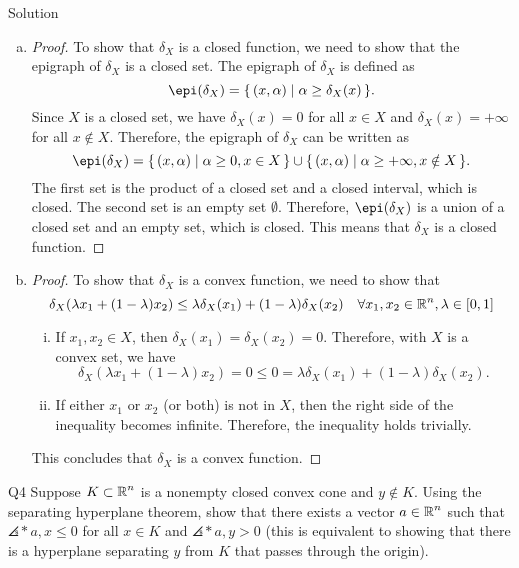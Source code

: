 \documentclass{article}
\begin{document}
\begin{solution}
    {Solution}
    \begin{enumerate}[(a)]
        \item {
            \begin{proof}
                To show that $\delta_X$ is a closed function, we need to show that the epigraph of $\delta_X$ is a closed set. The epigraph of $\delta_X$ is defined as
                \[
                    \epi(\delta_X) = \set{(x, \alpha) \mid \alpha \geq \delta_X(x)}.
                \]
                Since $X$ is a closed set, we have $\delta_X(x)=0$ for all $x\in X$ and $\delta_X(x)=+\infty$ for all $x\notin X$. Therefore, the epigraph of $\delta_X$ can be written as
                \[
                    \epi(\delta_X) = \set{(x, \alpha) \mid \alpha \geq 0, x\in X} \cup \set{(x, \alpha) \mid \alpha \geq +\infty, x\notin X}.
                \]
                The first set is the product of a closed set and a closed interval, which is closed. The second set is an empty set $\emptyset$. Therefore, $\epi(\delta_X)$ is a union of a closed set and an empty set, which is closed. This means that $\delta_X$ is a closed function.
            \end{proof}
        }
        \item {
            \begin{proof}
                To show that $\delta_X$ is a convex function, we need to show that \[\delta_X(\lambda x_1+(1-\lambda)x_2)\leq\lambda\delta_X(x_1)+(1-\lambda)\delta_X(x_2) \quad \forall x_1, x_2\in \operatorname{\mathbb{R}}^n, \lambda\in[0,1]\]
                \begin{enumerate}[(i)]
                    \item If $x_1, x_2\in X$, then $\delta_X(x_1)=\delta_X(x_2)=0$. Therefore, with $X$ is a convex set, we have \[\delta_X(\lambda x_1+(1-\lambda)x_2)=0\leq 0=\lambda\delta_X(x_1)+(1-\lambda)\delta_X(x_2).\]
                    \item If either $x_1$ or $x_2$ (or both) is not in $X$, then the right side of the inequality becomes infinite. Therefore, the inequality holds trivially.
                \end{enumerate}
                This concludes that $\delta_X$ is a convex function.
            \end{proof}
        }
    \end{enumerate}
\end{solution}

\begin{problem}
    {Q4}
    Suppose $K\subset\operatorname{\mathbb{R}}^n$ is a nonempty closed convex cone and $y\notin K$. Using the separating hyperplane theorem, show that there exists a vector $a\in \operatorname{\mathbb{R}}^n$ such that $\angles*{a,x}\leq 0$ for all $x\in K$ and $\angles*{a,y}>0$ (this is equivalent to showing that there is a hyperplane separating $y$ from $K$ that passes through the origin).
\end{problem}
\end{document}
